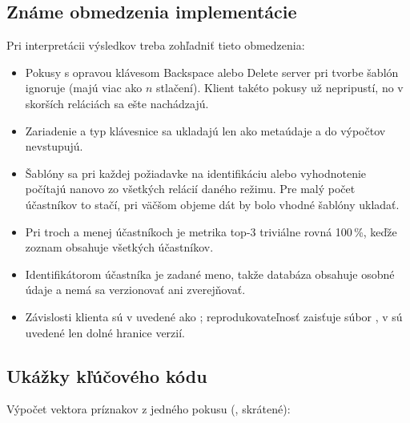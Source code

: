 \subsection{Známe obmedzenia implementácie}
\label{sec:obmedzenia}

Pri interpretácii výsledkov treba zohľadniť tieto obmedzenia:
\begin{itemize}
  \item Pokusy s opravou klávesom Backspace alebo Delete server pri tvorbe
        šablón ignoruje (majú viac ako $n$ stlačení). Klient takéto pokusy
        už nepripustí, no v skorších reláciách sa ešte nachádzajú.
  \item Zariadenie a typ klávesnice sa ukladajú len ako metaúdaje a do
        výpočtov nevstupujú.
  \item Šablóny sa pri každej požiadavke na identifikáciu alebo vyhodnotenie
        počítajú nanovo zo všetkých relácií daného režimu. Pre malý počet
        účastníkov to stačí, pri väčšom objeme dát by bolo vhodné šablóny
        ukladať.
  \item Pri troch a menej účastníkoch je metrika top-3 triviálne rovná
        100\,\%, keďže zoznam obsahuje všetkých účastníkov.
  \item Identifikátorom účastníka je zadané meno, takže databáza obsahuje
        osobné údaje a nemá sa verzionovať ani zverejňovať.
  \item Závislosti klienta sú v  uvedené ako
        ; reprodukovateľnosť zaisťuje súbor
        , v  sú uvedené
        len dolné hranice verzií.
\end{itemize}

\subsection{Ukážky kľúčového kódu}

Výpočet vektora príznakov z jedného pokusu (, skrátené):

